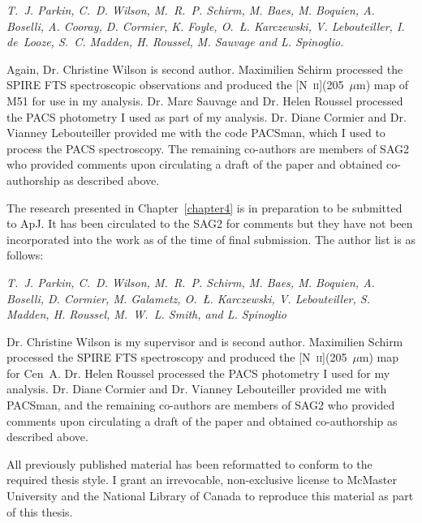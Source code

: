 \noindent \emph{T.~J. Parkin, C.~D. Wilson, M.~R.~P. Schirm, M. Baes, M. Boquien, A. Boselli, A. Cooray, D. Cormier, K. Foyle, O.~\L. Karczewski, V. Lebouteiller, I. de~Looze, S.~C. Madden, H. Roussel, M. Sauvage and L. Spinoglio.}

\noindent Again, Dr. Christine Wilson is second author.  Maximilien Schirm processed the SPIRE FTS spectroscopic observations and produced the [N~\textsc{ii}](205~$\mu$m) map of M51 for use in my analysis.  Dr. Marc Sauvage and Dr. Helen Roussel processed the PACS photometry I used as part of my analysis.  Dr. Diane Cormier and Dr. Vianney Lebouteiller provided me with the code PACSman, which I used to process the PACS spectroscopy.  The remaining co-authors are members of SAG2 who provided comments upon circulating a draft of the paper and obtained co-authorship as described above.

The research presented in Chapter~\ref{chapter4} is in preparation to be submitted to ApJ. It has been circulated to the SAG2 for comments but they have not been incorporated into the work as of the time of final submission.  The author list is as follows:

\noindent \emph{T.~J. Parkin, C.~D. Wilson, M.~R.~P. Schirm, M. Baes, M. Boquien, A. Boselli, D. Cormier, M. Galametz, O.~\L. Karczewski, V. Lebouteiller, S. Madden, H. Roussel, M.~W.~L. Smith, and L. Spinoglio}

\noindent Dr. Christine Wilson is my supervisor and is second author.  Maximilien Schirm processed the SPIRE FTS spectroscopy and produced the [N~\textsc{ii}](205~$\mu$m) map for Cen~A.  Dr. Helen Roussel processed the PACS photometry I used for my analysis.  Dr. Diane Cormier and Dr. Vianney Lebouteiller provided me with PACSman, and the remaining co-authors are members of SAG2 who provided comments upon circulating a draft of the paper and obtained co-authorship as described above.

All previously published material has been reformatted to conform to the required thesis 
style.  I grant an irrevocable, non-exclusive license to McMaster University and the National Library of Canada to reproduce this material as part of this thesis.
\newpage
\thispagestyle{empty}
\mbox{}